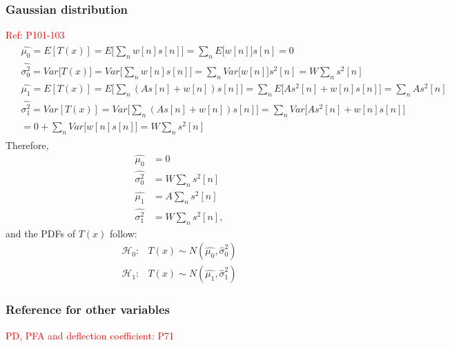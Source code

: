 \subsubsection{Gaussian distribution}
\textcolor{red}{Ref: P101-103}
\begin{align} \label{eq:pdfTx}
\begin{split}
&\hat{\mu_0}=E[T(x)]=E\big[\sum_nw[n]s[n]\big]=\sum_nE\big[w[n]\big]s[n]=0\\
&\hat{\sigma^2_0}=Var\big[T(x)\big]=Var\big[\sum_nw[n]s[n]\big]=\sum_nVar\big[w[n]\big]s^2[n]=W\sum_ns^2[n]\\
&\hat{\mu_1}=E[T(x)]=E\big[\sum_n(As[n]+w[n])s[n]\big]=\sum_nE\big[As^2[n]+w[n]s[n]\big]=\sum_nAs^2[n]\\
&\hat{\sigma^2_1}=Var[T(x)]=Var\big[\sum_n(As[n]+w[n])s[n]\big]=\sum_nVar\big[As^2[n]+w[n]s[n]\big]\\
&=0+\sum_nVar\big[w[n]s[n]\big]=W\sum_ns^2[n]
\end{split}
\end{align}
Therefore,
\begin{align} \label{eq:pdfTx}
\hat{\mu_0}&=0\\
\hat{\sigma_0^2}&=W\sum_ns^2[n]\\
\hat{\mu_1}&=A\sum_ns^2[n]\\
\hat{\sigma_1^2}&=W\sum_ns^2[n],
\end{align}
and the PDFs of $T(x)$ follow:
\begin{align}
\mathcal{H}_0: & T(x)\sim N(\hat{\mu_0}, \hat{\sigma}_0^2)\\
\mathcal{H}_1: & T(x)\sim N(\hat{\mu_1}, \hat{\sigma}_1^2)
\end{align}

\subsubsection{Reference for other variables}
\textcolor{red}{PD, PFA and deflection coefficient: P71}